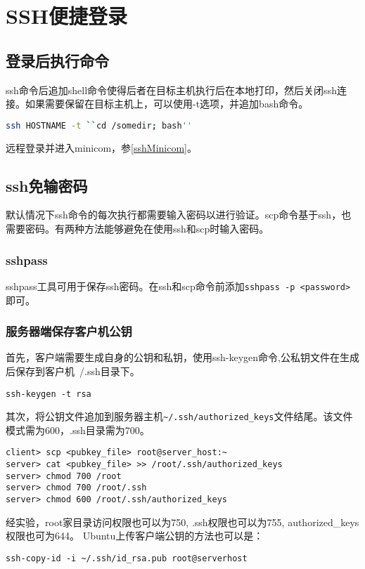 \section{SSH便捷登录}

\subsection{登录后执行命令}
ssh命令后追加shell命令使得后者在目标主机执行后在本地打印，然后关闭ssh连接。如果需要保留在目标主机上，可以使用-t选项，并追加bash命令。
\begin{lstlisting}[language=bash]
   ssh HOSTNAME -t ``cd /somedir; bash'' 
\end{lstlisting}
远程登录并进入minicom，参\ref{sshMinicom}。

\subsection{ssh免输密码}

默认情况下ssh命令的每次执行都需要输入密码以进行验证。scp命令基于ssh，也需要密码。有两种方法能够避免在使用ssh和scp时输入密码。

\subsubsection{sshpass}
sshpass工具可用于保存ssh密码。在ssh和scp命令前添加\verb+sshpass -p <password>+即可。

\subsubsection{服务器端保存客户机公钥}
首先，客户端需要生成自身的公钥和私钥，使用ssh-keygen命令,公私钥文件在生成后保存到客户机~/.ssh目录下。
\begin{verbatim}
ssh-keygen -t rsa
\end{verbatim}

其次，将公钥文件追加到服务器主机\verb+~/.ssh/authorized_keys+文件结尾。该文件模式需为600，.ssh目录需为700。
\begin{verbatim}
client> scp <pubkey_file> root@server_host:~
server> cat <pubkey_file> >> /root/.ssh/authorized_keys
server> chmod 700 /root
server> chmod 700 /root/.ssh
server> chmod 600 /root/.ssh/authorized_keys
\end{verbatim}
经实验，root家目录访问权限也可以为750, .ssh权限也可以为755, authorized\_keys权限也可为644。
Ubuntu上传客户端公钥的方法也可以是：
\begin{verbatim}
ssh-copy-id -i ~/.ssh/id_rsa.pub root@serverhost
\end{verbatim}


